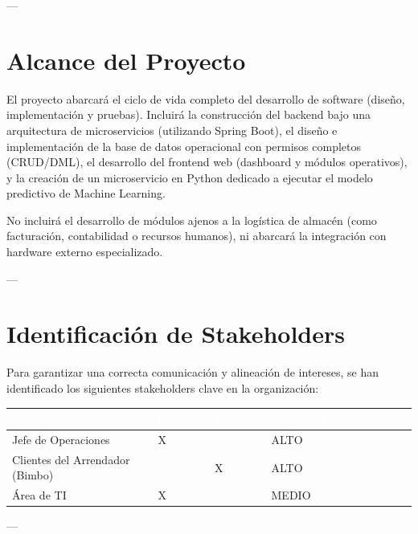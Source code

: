 \documentclass[11pt]{article}
\newcounter{none} %
\begin{document}
---

\section{Alcance del Proyecto}

El proyecto abarcará el ciclo de vida completo del desarrollo de software (diseño, implementación y pruebas). Incluirá la construcción del backend bajo una arquitectura de microservicios (utilizando Spring Boot), el diseño e implementación de la base de datos operacional con permisos completos (CRUD/DML), el desarrollo del frontend web (dashboard y módulos operativos), y la creación de un microservicio en Python dedicado a ejecutar el modelo predictivo de Machine Learning.

No incluirá el desarrollo de módulos ajenos a la logística de almacén (como facturación, contabilidad o recursos humanos), ni abarcará la integración con hardware externo especializado.

---

\section{Identificación de Stakeholders}

Para garantizar una correcta comunicación y alineación de intereses, se han identificado los siguientes stakeholders clave en la organización:

\vspace{0.3cm}
\setlength{\tabcolsep}{6pt}
\renewcommand{\arraystretch}{1.5}
{\def\LTcaptype{none}
\begin{longtable}[]{@{}
  >{\raggedright\arraybackslash}p{0.36\linewidth}
  >{\centering\arraybackslash}p{0.14\linewidth}
  >{\centering\arraybackslash}p{0.14\linewidth}
  >{\centering\arraybackslash}p{0.36\linewidth}@{}}
\rowcolor{DeepNavy}
\textcolor{white}{\textbf{Stakeholder}} & \textcolor{white}{\textbf{Interno}} & \textcolor{white}{\textbf{Externo}} & \textcolor{white}{\textbf{Nivel de Interés}} \\ \hline
\endhead
\rowcolor{LightGray}
Jefe de Operaciones & X & & ALTO \\ \hline
Clientes del Arrendador (Bimbo) & & X & ALTO \\ \hline
\rowcolor{LightGray}
Área de TI & X & & MEDIO \\ \hline
\end{longtable}
}

---
\end{document}
